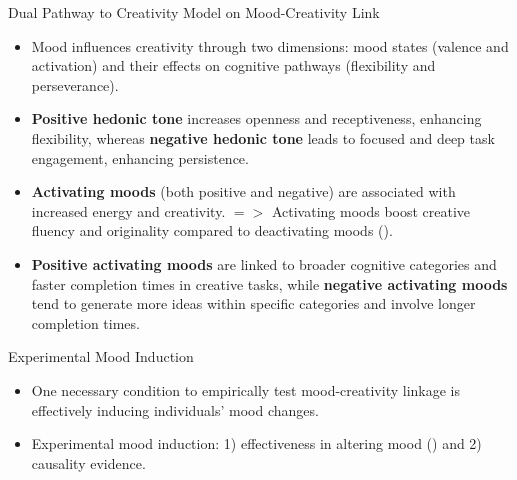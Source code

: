 \documentclass[pdf]{beamer}
\begin{document}
\begin{frame}{Dual Pathway to Creativity Model on Mood-Creativity Link}
\begin{itemize}
    \item<1-> Mood influences creativity through \alert{two dimensions}: mood states (valence and activation) and their effects on cognitive pathways (flexibility and perseverance).
    \item<2-> \textbf{Positive hedonic tone} increases openness and receptiveness, enhancing flexibility, whereas \textbf{negative hedonic tone} leads to focused and deep task engagement, enhancing persistence.
    \item<3-> \textbf{Activating moods} (both positive and negative) are associated with increased energy and creativity. $=>$ Activating moods boost creative fluency and originality compared to deactivating moods (\cite{de_dreu_hedonic_2008}).
    \item<4-> \textbf{Positive activating moods} are linked to broader cognitive categories and faster completion times in creative tasks, while \textbf{negative activating moods} tend to generate more ideas within specific categories and involve longer completion times.
\end{itemize}
\end{frame}


\begin{frame}{Experimental Mood Induction}
\begin{itemize}
    \item<1-> One necessary condition to empirically test mood-creativity linkage is effectively inducing individuals’ mood changes.
    \vspace{1em}
    \item<2-> \smiley{} \alert{Experimental mood induction}: 1) effectiveness in altering mood (\cite{westermann_relative_1996}) and 2) causality evidence.
\end{itemize}
\end{frame}
\end{document}
